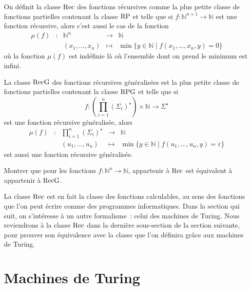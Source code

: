 \begin{definition}
  On définit la classe $\operatorname{Rec}$ des fonctions récursives comme la plus petite
  classe de fonctions partielles contenant la classe $\operatorname{RP}$ et telle que si
  $f : \mathbb N^{n+1} \to \mathbb N$ est une fonction récursive, alors
  c'est aussi le cas de la fonction
  \[\begin{array}{ccccc}
  \mu(f) & : & \mathbb N^n & \longrightarrow & \mathbb N\\
  & & (x_1,\ldots,x_n) &\longmapsto & \min \{y \in \mathbb N \mid
  f(x_1,\ldots,x_n,y) = 0\}
  \end{array}\]
  où la fonction $\mu(f)$ est indéfinie là où l'ensemble dont on prend le
  minimum est infini.

  La classe $\operatorname{RecG}$ des fonctions récursives généralisées est la plus petite
  classe de fonctions partielles contenant la classe $\operatorname{RPG}$ et telle que si
  \[f : \left(\prod_{i = 1}^n (\Sigma_i)^\star\right)
  \times \mathbb N \to \Sigma^\star\]
  est une fonction récursive généralisée, alors
  \[\begin{array}{ccccc}
  \mu(f) & : & \displaystyle\prod_{i = 1}^n (\Sigma_i)^\star &\longrightarrow &
  \mathbb N\\
  & & (u_1,\ldots,u_n) &\longmapsto &\min\{y \in \mathbb N \mid
  f(u_1,\ldots,u_n,y) = \varepsilon\}
  \end{array}\]
  est aussi une fonction récursive généralisée.
\end{definition}

\begin{exercise}
  Montrer que pour les fonctions $f : \mathbb N^n \to \mathbb N$, appartenir à
  $\operatorname{Rec}$ est équivalent à appartenir à $\operatorname{RecG}$.
\end{exercise}

La classe $\operatorname{Rec}$ est en fait la classe des fonctions calculables, au sens des
fonctions que l'on peut écrire comme des programmes informatiques. Dans la
section qui suit, on s'intéresse à un autre formalisme~: celui des machines de
Turing. Nous reviendrons à la classe $\operatorname{Rec}$ dans la dernière sous-section de la
section suivante, pour prouver son équivalence avec la classe que l'on définira
grâce aux machines de Turing.

\section{Machines de Turing}


